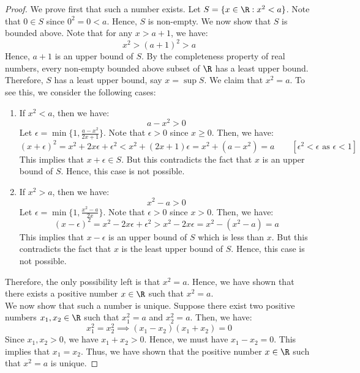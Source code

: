 \documentclass[openany]{book}
\begin{document}
\begin{proof}
    We prove first that such a number exists. Let $S = \{x \in \R : x^2 < a\}$. Note that $0 \in S$ since $0^2 = 0 < a$. Hence, $S$ is non-empty. We now show that $S$ is bounded above. Note that for any $x > a + 1$, we have:
    $$x^2 > (a + 1)^2 > a$$
    Hence, $a + 1$ is an upper bound of $S$. By the completeness property of real numbers, every non-empty bounded above subset of $\R$ has a least upper bound. Therefore, $S$ has a least upper bound, say $x = \sup S$. We claim that $x^2 = a$. To see this, we consider the following cases:
    \begin{enumerate}
        \item If $x^2 < a$, then we have:
        $$a - x^2 > 0$$
        Let $\epsilon = \min\{1, \frac{a - x^2}{2x + 1}\}$. Note that $\epsilon > 0$ since $x \geq 0$. Then, we have:
        $$(x + \epsilon)^2 = x^2 + 2x\epsilon + \epsilon^2 < x^2 + (2x + 1)\epsilon = x^2 + (a - x^2) = a \quad \quad [\epsilon^2 < \epsilon \text{ as } \epsilon < 1]$$
        This implies that $x + \epsilon \in S$. But this contradicts the fact that $x$ is an upper bound of $S$. Hence, this case is not possible.
        \item If $x^2 > a$, then we have:
        $$x^2 - a > 0$$
        Let $\epsilon = \min\{1, \frac{x^2 - a}{2x}\}$. Note that $\epsilon > 0$ since $x > 0$. Then, we have:
        $$(x - \epsilon)^2 = x^2 - 2x\epsilon + \epsilon^2 > x^2 - 2x\epsilon = x^2 - (x^2 - a) = a$$
        This implies that $x - \epsilon$ is an upper bound of $S$ which is less than $x$. But this contradicts the fact that $x$ is the least upper bound of $S$. Hence, this case is not possible.
    \end{enumerate}
        Therefore, the only possibility left is that $x^2 = a$. Hence, we have shown that there exists a positive number $x \in \R$ such that $x^2 = a$. \\
        We now show that such a number is unique. Suppose there exist two positive numbers $x_1, x_2 \in \R$ such that $x_1^2 = a$ and $x_2^2 = a$. Then, we have:
        $$x_1^2 = x_2^2 \implies (x_1 - x_2)(x_1 + x_2) = 0$$
        Since $x_1, x_2 > 0$, we have $x_1 + x_2 > 0$. Hence, we must have $x_1 - x_2 = 0$. This implies that $x_1 = x_2$. Thus, we have shown that the positive number $x \in \R$ such that $x^2 = a$ is unique.
\end{proof}
\end{document}
